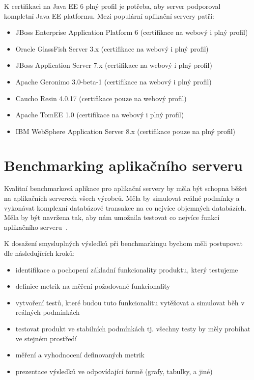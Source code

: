 \documentclass[122pt,oneside]{fithesis}
\begin{document}
K certifikaci na Java EE 6 plný profil je potřeba, aby server podporoval kompletní Java EE platformu.
Mezi populární aplikační servery patří:
\begin{itemize}
  \item JBoss Enterprise Application Platform 6 (certifikace na webový i plný profil)
  \item Oracle GlassFish Server 3.x (certifikace na webový i plný profil)
  \item JBoss Application Server 7.x (certifikace na webový i plný profil)
  \item Apache Geronimo 3.0-beta-1 (certifikace na webový i plný profil)
  \item Caucho Resin 4.0.17 (certifikace pouze na webový profil)
  \item Apache TomEE 1.0 (certifikace na webový i plný profil)
  \item IBM WebSphere Application Server 8.x (certifikace pouze na plný profil)
\end{itemize}

\section{Benchmarking aplikačního serveru}
Kvalitní benchmarková aplikace pro aplikační servery by měla být schopna běžet na aplikačních serverech všech výrobců. Měla by simulovat reálné podmínky a vykonávat komplexní databázové transakce na co nejvíce objemných databázích. Měla by být navržena tak, aby nám umožnila testovat co nejvíce funkcí aplikačního serveru~\cite{sybase}. 

K dosažení smysluplných výsledků při benchmarkingu bychom měli postupovat dle následujících kroků:
\begin{itemize}
  \item identifikace a pochopení základní funkcionality produktu, který testujeme
  \item definice metrik na měření požadované funkcionality
  \item vytvoření testů, které budou tuto funkcionalitu vytěžovat a simulovat běh v reálných podmínkách
  \item testovat produkt ve stabilních podmínkách tj. všechny testy by měly probíhat ve stejném prostředí
  \item měření a vyhodnocení definovaných metrik
  \item prezentace výsledků ve odpovídající formě (grafy, tabulky, a jiné)
\end{itemize}
\end{document}
